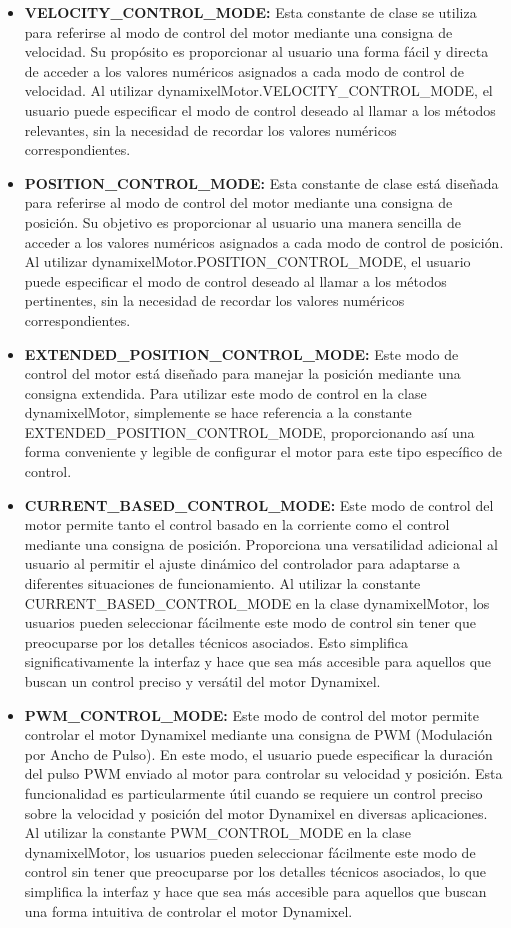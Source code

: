 \documentclass{article}
\begin{document}
\begin{itemize}
    \item \textbf{VELOCITY\_CONTROL\_MODE:} Esta constante de clase se utiliza para referirse al modo de control del motor mediante una consigna de velocidad. Su propósito es proporcionar al usuario una forma fácil y directa de acceder a los valores numéricos asignados a cada modo de control de velocidad. Al utilizar dynamixelMotor.VELOCITY\_CONTROL\_MODE, el usuario puede especificar el modo de control deseado al llamar a los métodos relevantes, sin la necesidad de recordar los valores numéricos correspondientes.

    \item \textbf{POSITION\_CONTROL\_MODE:} Esta constante de clase está diseñada para referirse al modo de control del motor mediante una consigna de posición. Su objetivo es proporcionar al usuario una manera sencilla de acceder a los valores numéricos asignados a cada modo de control de posición. Al utilizar dynamixelMotor.POSITION\_CONTROL\_MODE, el usuario puede especificar el modo de control deseado al llamar a los métodos pertinentes, sin la necesidad de recordar los valores numéricos correspondientes.

    \item \textbf{EXTENDED\_POSITION\_CONTROL\_MODE:} Este modo de control del motor está diseñado para manejar la posición mediante una consigna extendida.
    Para utilizar este modo de control en la clase dynamixelMotor, simplemente se hace referencia a la constante EXTENDED\_POSITION\_CONTROL\_MODE, proporcionando así una forma conveniente y legible de configurar el motor para este tipo específico de control.

    \item \textbf{CURRENT\_BASED\_CONTROL\_MODE:} Este modo de control del motor permite tanto el control basado en la corriente como el control mediante una consigna de posición. Proporciona una versatilidad adicional al usuario al permitir el ajuste dinámico del controlador para adaptarse a diferentes situaciones de funcionamiento.
    Al utilizar la constante CURRENT\_BASED\_CONTROL\_MODE en la clase dynamixelMotor, los usuarios pueden seleccionar fácilmente este modo de control sin tener que preocuparse por los detalles técnicos asociados. Esto simplifica significativamente la interfaz y hace que sea más accesible para aquellos que buscan un control preciso y versátil del motor Dynamixel.

    \item \textbf{PWM\_CONTROL\_MODE:} Este modo de control del motor permite controlar el motor Dynamixel mediante una consigna de PWM (Modulación por Ancho de Pulso). En este modo, el usuario puede especificar la duración del pulso PWM enviado al motor para controlar su velocidad y posición. Esta funcionalidad es particularmente útil cuando se requiere un control preciso sobre la velocidad y posición del motor Dynamixel en diversas aplicaciones. Al utilizar la constante PWM\_CONTROL\_MODE en la clase dynamixelMotor, los usuarios pueden seleccionar fácilmente este modo de control sin tener que preocuparse por los detalles técnicos asociados, lo que simplifica la interfaz y hace que sea más accesible para aquellos que buscan una forma intuitiva de controlar el motor Dynamixel.
    

\end{itemize}
\end{document}
